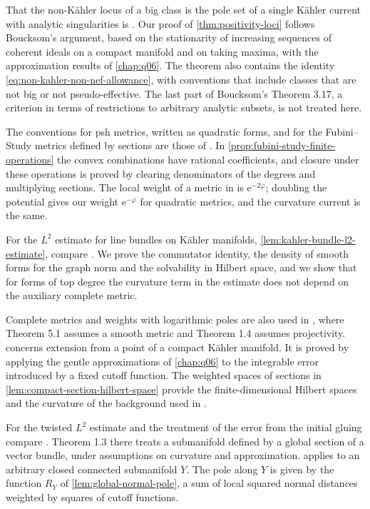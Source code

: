 That the non-K\"ahler locus of a big class is the pole set of a single K\"ahler current with analytic singularities is \cite[Definition 3.16 and Theorem 3.17]{Bou04}. Our proof of \cref{thm:positivity-loci} follows Boucksom's argument, based on the stationarity of increasing sequences of coherent ideals on a compact manifold and on taking maxima, with the approximation results of \cref{chap:q06}. The theorem also contains the identity \eqref{eq:non-kahler-non-nef-allowance}, with conventions that include classes that are not big or not pseudo-effective. The last part of Boucksom's Theorem 3.17, a criterion in terms of restrictions to arbitrary analytic subsets, is not treated here.

The conventions for psh metrics, written as quadratic forms, and for the Fubini--Study metrics defined by sections are those of \cite[Chapter on plurisubharmonic functions, Definitions 1.8.3, 1.8.6 and 1.8.7]{XiaSampleBook}. In \cref{prop:fubini-study-finite-operations} the convex combinations have rational coefficients, and closure under these operations is proved by clearing denominators of the degrees and multiplying sections. The local weight of a metric in \cite[Section 2.4]{Bou04} is $\mathrm e^{-2\varphi}$; doubling the potential gives our weight $\mathrm e^{-\varphi}$ for quadratic metrics, and the curvature current is the same.

For the $L^2$ estimate for line bundles on K\"ahler manifolds, \cref{lem:kahler-bundle-l2-estimate}, compare \cite[Chapter VI, Section 6.1, and Chapter VII, Theorem 1.1, Theorem 1.2 and Corollary 1.3]{DemBook}. We prove the commutator identity, the density of smooth forms for the graph norm and the solvability in Hilbert space, and we show that for forms of top degree the curvature term in the estimate does not depend on the auxiliary complete metric.

Complete metrics and weights with logarithmic poles are also used in \cite[Theorem 5.1 and its proof]{Hisamoto2012v2}, where Theorem 5.1 assumes a smooth metric and Theorem 1.4 assumes projectivity.  concerns extension from a point of a compact K\"ahler manifold. It is proved by applying the gentle approximations of \cref{chap:q06} to the integrable error introduced by a fixed cutoff function. The weighted spaces of sections in \cref{lem:compact-section-hilbert-space} provide the finite-dimensional Hilbert spaces and the curvature of the background used in \cite[Proposition~1.8.2]{XiaSampleBook}.

For the twisted $L^2$ estimate and the treatment of the error from the initial gluing compare \cite[Section 2 and the Appendix]{Cao2017v2}. Theorem 1.3 there treats a submanifold defined by a global section of a vector bundle, under assumptions on curvature and approximation.  applies to an arbitrary closed connected submanifold $Y$. The pole along $Y$ is given by the function $R_Y$ of \cref{lem:global-normal-pole}, a sum of local squared normal distances weighted by squares of cutoff functions.

